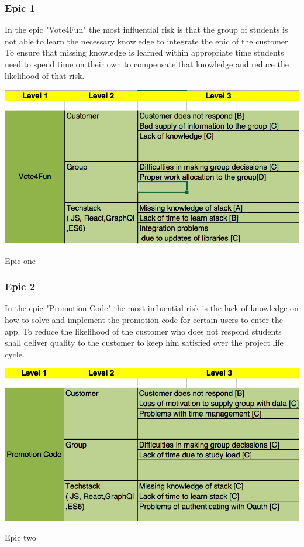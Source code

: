 \subsubsection{Epic 1}
In the epic "Vote4Fun" the most influential risk is that the group of students is not able to learn the necessary knowledge to integrate the epic of the customer. 
\newline
To ensure that missing knowledge is learned within appropriate time students need to spend time on their own to compensate that knowledge and reduce the likelihood of that risk.

\begin{table}[!ht]
  \includegraphics[width=\linewidth]{content/diagram/risk//vote4fun.png}
  \caption{Epic one}
\end{table}
\newpage
\subsubsection{Epic 2}
In the epic "Promotion Code" the most influential risk is the lack of knowledge on how to solve and implement the promotion code for certain users to enter the app. 
\newline
To reduce the likelihood of the customer who does not respond students shall deliver quality to the customer to keep him satisfied over the project life cycle.
\begin{table}[!ht]
  \includegraphics[width=\linewidth]{content/diagram/risk/promotioncode.png}
  \caption{Epic two}
\end{table}

